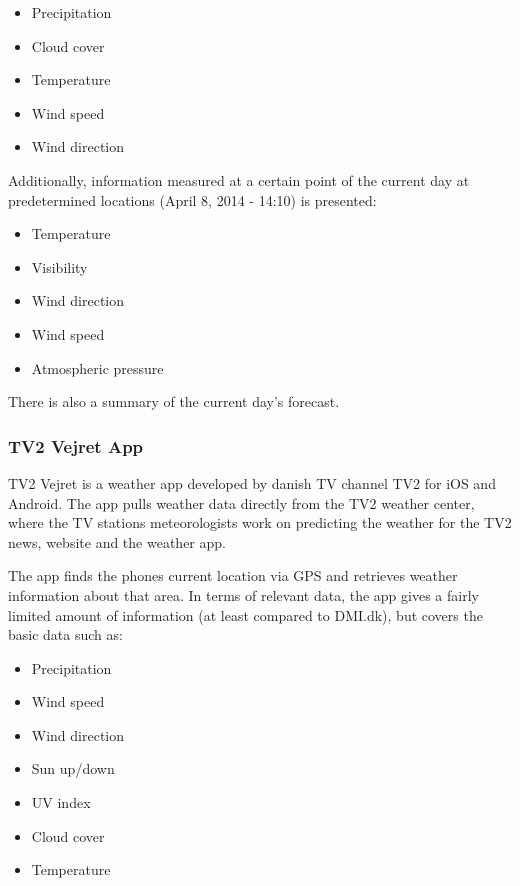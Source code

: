 \begin{itemize}
    \item Precipitation
    \item Cloud cover
    \item Temperature
    \item Wind speed
    \item Wind direction
\end{itemize}

Additionally, information measured at a certain point of the current day at predetermined locations (April 8, 2014 - 14:10) is presented:

\begin{itemize}
    \item Temperature
    \item Visibility
    \item Wind direction
    \item Wind speed
    \item Atmospheric pressure
\end{itemize}

There is also a summary of the current day’s forecast.



\subsubsection*{TV2 Vejret App} %
\label{ssub:tv2_vejret_app}

TV2 Vejret is a weather app developed by danish TV channel TV2 for iOS and Android. 
The app pulls weather data directly from the TV2 weather center, where the TV stations meteorologists work on predicting the weather for the TV2 news, website and the weather app.


The app finds the phones current location via GPS and retrieves weather information about that area. 
In terms of relevant data, the app gives a fairly limited amount of information (at least compared to DMI.dk), but covers the basic data such as:

\begin{itemize}
    \item Precipitation
    \item Wind speed
    \item Wind direction
    \item Sun up/down
    \item UV index
    \item Cloud cover
    \item Temperature
\end{itemize} 

